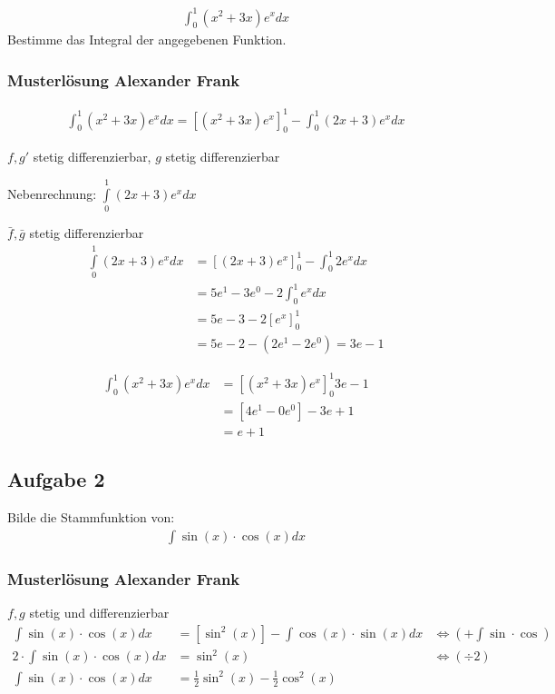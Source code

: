 \begin{align*}
    \int_0^1  (x^2 + 3x)e^x dx
\end{align*}
Bestimme das Integral der angegebenen Funktion.


\subsubsection{Musterlösung Alexander Frank}
\begin{align*}
    \int_0^1  (x^2 + 3x)e^x dx = \left[(x^2 + 3x)e^x\right]_0^1 - \int_0^1 (2x + 3) e^x dx
\end{align*}


$f, g'$ stetig differenzierbar, $g$ stetig differenzierbar\\

\begin{tcolorbox}[colframe=black!5!white]
Nebenrechnung: $\int\limits_0^1 (2x + 3)e^x dx$

$\bar f, \bar g$ stetig differenzierbar
\begin{align*}
    \int\limits_0^1 (2x + 3)e^x dx &= \left[(2x + 3)e^x\right]_0^1 - \int_0^1 2e^x dx\\
    &= 5e^1 - 3e^0 - 2 \int_0^1 e^x dx\\
    &= 5e - 3 - 2 [e^x]_0^1\\
    &= 5e - 2 - (2e^1 - 2e^0) = 3e - 1
\end{align*}
\end{tcolorbox}

\begin{align*}
    \int_0^1  (x^2 + 3x)e^x dx &= \left[(x^2 + 3x)e^x\right]_0^1 3e - 1\\
    &= \left[4e^1 - 0e^0\right] - 3e + 1\\
    &= e + 1
\end{align*}

\subsection{Aufgabe 2}

Bilde die Stammfunktion von: 
\begin{align*}
    \int \sin(x) \cdot \cos(x) dx
\end{align*}

\subsubsection{Musterlösung Alexander Frank}
$f, g$ stetig und differenzierbar
\begin{align*}
    \int \sin(x) \cdot \cos(x) dx &= \left[\sin^2(x)\right] - \int \cos(x) \cdot \sin(x) dx & \Leftrightarrow (+ \int \sin \cdot \cos)\\
    2 \cdot \int \sin(x) \cdot \cos(x) dx
    &= \sin^2(x) &\Leftrightarrow (\div 2)\\
    \int \sin(x) \cdot \cos(x) dx &= \frac{1}{2} \sin^2(x) - \frac{1}{2} \cos^2(x)
\end{align*}


